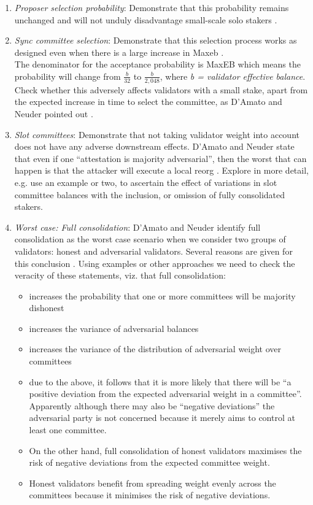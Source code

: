 \documentclass[UTF8]{article}
\begin{document}
\begin{enumerate}

\item \textit{Proposer selection probability}: Demonstrate that this  probability remains unchanged and will not unduly disadvantage small-scale solo stakers \cite{Neuder2023a}. 

\item \textit{Sync committee selection}: Demonstrate that this selection process works as designed even when there is a large increase in Max\gls{eb} \cite{Neuder2023a}.\\
The denominator for the acceptance probability is MaxEB which means the probability will change from $\frac{b}{32}$ to $\frac{b}{2,048}$, where \textit{b = validator effective balance}. Check whether this adversely affects validators with a small stake, apart from the expected increase in time to select the committee, as D'Amato and Neuder pointed out \cite{damato2023}.

\item \textit{Slot committees}: Demonstrate that not taking validator weight into account does not have any adverse downstream effects. D'Amato and Neuder state that even if one ``attestation is majority adversarial'', then the worst that can happen is that the attacker will execute a local reorg \cite{damato2023}. Explore in more detail, e.g. use an example or two, to ascertain the effect of variations in slot committee balances with the inclusion, or omission of fully consolidated stakers. 

\item \textit{Worst case: Full consolidation}: D'Amato and Neuder identify full consolidation as the worst case scenario when we consider two groups of validators: honest and adversarial validators. Several reasons are given for this conclusion \cite{damato2023}. Using examples or other approaches we need to check the veracity of these statements, viz. that full consolidation:
	\begin{itemize}
	\item increases the probability that one or more committees will be majority dishonest
	\item increases the variance of adversarial balances
	\item increases the variance of the distribution of adversarial weight over committees
	\item due to the above, it follows that it is more likely that there will be ``a positive deviation from the expected adversarial weight in a committee''. Apparently although there may also be ``negative deviations'' the adversarial party is not concerned because it merely aims to control at least one committee.
	\item On the other hand, full consolidation of honest validators maximises the risk of negative deviations from the expected committee weight.
	\item Honest validators benefit from spreading weight evenly across the committees because it minimises the risk of negative deviations.
	\end{itemize}


\end{enumerate}
\end{document}
